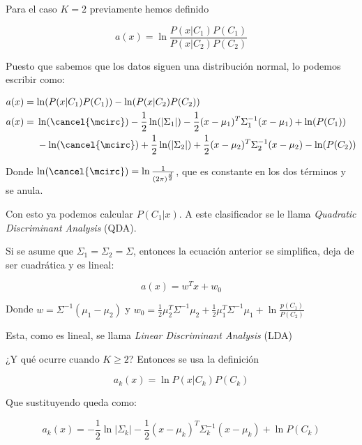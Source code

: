 Para el caso $K = 2$ previamente hemos definido

\begin{equation*}
    a(x) = \ln
    \frac
    {
    P(x|C_1)P(C_1)
    }{P(x | C_2)P(C_2)}
\end{equation*}

Puesto que sabemos que los datos siguen una distribución normal, lo podemos escribir como:

\begin{align*}
    a(x) &= \ln(P(x|C_1)P(C_1)) - \ln(P(x | C_2)P(C_2)) \\
    a(x) &=
    \begin{aligned}[t]
        &\ln(\cancel{\mcirc}) -\frac{1}{2}\ln(|\Sigma_1|) -\frac{1}{2}
        (x - \mu_1)^T
        \Sigma_1^{-1}
        (x - \mu_1) + \ln(P(C_1)) \\
        &-\ln(\cancel{\mcirc}) + \frac{1}{2}\ln(|\Sigma_2|) + \frac{1}{2}
        (x - \mu_2)^T
        \Sigma_2^{-1}
        (x - \mu_2) -\ln(P(C_2)) \\
    \end{aligned}\\
\end{align*}

Donde $\ln(\cancel{\mcirc}) = \ln \frac{1}{(2\pi)^{\frac{d}{2}}}$, que es constante en los dos términos y se anula.

Con esto ya podemos calcular $P(C_1|x)$. A este clasificador se le llama \textit{Quadratic Discriminant Analysis} (QDA).

Si se asume que $\Sigma_1 = \Sigma_2 = \Sigma$, entonces la ecuación anterior se simplifica, deja de ser cuadrática y es lineal:

\begin{equation*}
    a(x) = w^Tx + w_0
\end{equation*}

Donde $w = \Sigma^{-1} (\mu_1 - \mu_2)$ y $w_0 = \frac{1}{2}\mu_2^T\Sigma^{-1}\mu_2 + \frac{1}{2}\mu_1^T\Sigma^{-1}\mu_1 + \ln \frac{p(C_1)}{P(C_2)}$

Esta, como es lineal, se llama \textit{Linear Discriminant Analysis} (LDA)

¿Y qué ocurre cuando $K \geq 2$? Entonces se usa la definición

\begin{equation*}
    a_k(x) = \ln P(x|C_k)P(C_k)
\end{equation*}

Que sustituyendo queda como:

\begin{equation*}
    a_k(x) = -\frac{1}{2}\ln|\Sigma_k| - \frac{1}{2}(x - \mu_k)^T\Sigma_k^{-1}(x - \mu_k) + \ln P(C_k)
\end{equation*}

